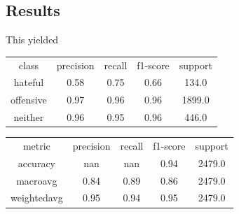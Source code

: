 \documentclass[11pt,a4paper]{article}
\begin{document}
\subsection{Results}
This yielded 
\begin{center}
\begin{tabular}{c c c c c}
class & precision & recall & f1-score & support \\
hateful & 0.58 & 0.75 & 0.66 & 134.0 \\
offensive & 0.97 & 0.96 & 0.96 & 1899.0 \\
neither & 0.96 & 0.95 & 0.96 & 446.0 \\
\end{tabular}
\end{center}

\begin{center}
\begin{tabular}{c c c c c}
metric & precision & recall & f1-score & support \\
accuracy & nan & nan & 0.94 & 2479.0 \\
macroavg & 0.84 & 0.89 & 0.86 & 2479.0 \\
weightedavg & 0.95 & 0.94 & 0.95 & 2479.0 \\
\end{tabular}
\end{center}




\end{document}
